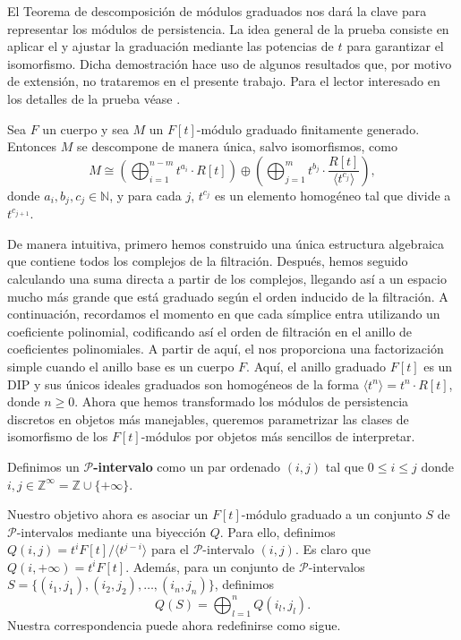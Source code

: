 El Teorema de descomposición de módulos graduados nos dará la clave para representar
los módulos de persistencia. La idea general de la prueba consiste en aplicar el
 y ajustar la graduación mediante las potencias de $t$
para garantizar el isomorfismo. Dicha demostración hace uso de algunos
resultados que, por motivo de extensión, no trataremos en el presente trabajo. Para
el lector interesado en los detalles de la prueba véase \cite{webb1985decomposition}.

\begin{teorema}
	 \label{teo:desc-mod-grad} Sea
	$F$ un cuerpo y sea $M$ un $F[t]$-módulo graduado finitamente generado.
	Entonces $M$ se descompone de manera única, salvo isomorfismos, como
	\[
	M \cong \left( \bigoplus_{i=1}^{n-m}t^{a_i}\cdot R[t] \right) \oplus \left( \bigoplus
	_{j=1}^{m}t^{b_j}\cdot \frac{R[t]}{\langle t^{c_j}\rangle}\right),
	\]
	donde $a_{i}, b_{j}, c_{j} \in \mathbb{N}$, y para cada $j$, $t^{c_j}$ es un
	elemento homogéneo tal que divide a $t^{c_{j+1}}$.
\end{teorema}

De manera intuitiva, primero hemos construido una única estructura algebraica que
contiene todos los complejos de la filtración. Después, hemos seguido calculando
una suma directa a partir de los complejos, llegando así a un espacio mucho más
grande que está graduado según el orden inducido de la filtración. A continuación,
recordamos el momento en que cada símplice entra utilizando un coeficiente
polinomial, codificando así el orden de filtración en el anillo de coeficientes polinomiales.
A partir de aquí, el  nos proporciona una
factorización simple cuando el anillo base es un cuerpo $F$. Aquí, el anillo
graduado $F[t]$ es un DIP y sus únicos ideales graduados son homogéneos de la
forma $\langle t^{n} \rangle = t^{n} \cdot R[t]$, donde $n \geq 0$. Ahora que
hemos transformado los módulos de persistencia discretos en objetos más
manejables, queremos parametrizar las clases de isomorfismo de los $F[t]$-módulos
por objetos más sencillos de interpretar.

\begin{definicion}
	Definimos un \textbf{$\mathcal{P}$-intervalo} como un par ordenado $(i, j)$
	tal que $0 \leq i \leq j$ donde
	$i,j \in \mathbb{Z}^{\infty}= \mathbb{Z}\cup \{+\infty\}$.
\end{definicion}

Nuestro objetivo ahora es asociar un $F[t]$-módulo graduado a un conjunto $S$ de
$\mathcal{P}$-intervalos mediante una biyección $Q$. Para ello, definimos
$Q(i, j) = t^{i} F[t]/\langle t^{j-i}\rangle$ para el $\mathcal{P}$-intervalo
$(i, j)$. Es claro que $Q(i, +\infty) = t^{i} F[t]$. Además, para un conjunto de
$\mathcal{P}$-intervalos $S = \{(i_{1}, j_{1}), (i_{2}, j_{2}), \ldots, (i_{n}, j
_{n})\}$, definimos
\[
Q(S) = \bigoplus_{l=1}^{n} Q(i_{l}, j_{l}).
\]
Nuestra correspondencia puede ahora redefinirse como sigue.

